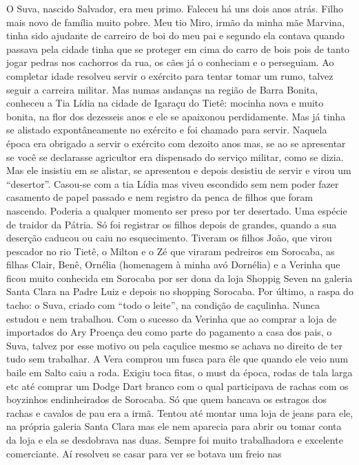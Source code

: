 \documentclass[12pt,brazil,]{book}
\begin{document}
O Suva, nascido Salvador, era meu primo. Faleceu há uns dois anos atrás.
Filho mais novo de família muito pobre. Meu tio Miro, irmão da minha mãe
Marvina, tinha sido ajudante de carreiro de boi do meu pai e segundo ela
contava quando passava pela cidade tinha que se proteger em cima do
carro de bois pois de tanto jogar pedras nos cachorros da rua, os cães
já o conheciam e o perseguiam. Ao completar idade resolveu servir o
exército para tentar tomar um rumo, talvez seguir a carreira militar.
Mas numas andanças na região de Barra Bonita, conheceu a Tia Lídia na
cidade de Igaraçu do Tietê: mocinha nova e muito bonita, na flor dos
dezesseis anos e ele se apaixonou perdidamente. Mas já tinha se alistado
expontâneamente no exército e foi chamado para servir. Naquela época era
obrigado a servir o exército com dezoito anos mas, se ao se apresentar
se você se declarasse agricultor era dispensado do serviço militar, como
se dizia. Mas ele insistiu em se alistar, se apresentou e depois
desistiu de servir e virou um ``desertor''. Casou-se com a tia Lídia mas
viveu escondido sem nem poder fazer casamento de papel passado e nem
registro da penca de filhos que foram nascendo. Poderia a qualquer
momento ser preso por ter desertado. Uma espécie de traidor da Pátria.
Só foi registrar os filhos depois de grandes, quando a sua deserção
caducou ou caiu no esquecimento. Tiveram os filhos João, que virou
pescador no rio Tietê, o Milton e o Zé que viraram pedreiros em
Sorocaba, as filhas Clair, Benê, Ornélia (homenagem à minha avó
Dornélia) e a Verinha que ficou muito conhecida em Sorocaba por ser dona
da loja Shoppig Seven na galeria Santa Clara na Padre Luiz e depois no
shopping Sorocaba. Por último, a raspa do tacho: o Suva, criado com
``todo o leite'', na condição de caçulinha. Nunca estudou e nem
trabalhou. Com o sucesso da Verinha que ao comprar a loja de importados
do Ary Proença deu como parte do pagamento a casa dos pais, o Suva,
talvez por esse motivo ou pela caçulice mesmo se achava no direito de
ter tudo sem trabalhar. A Vera comprou um fusca para êle que quando ele
veio num baile em Salto caiu a roda. Exigiu toca fitas, o must da época,
rodas de tala larga etc até comprar um Dodge Dart branco com o qual
participava de rachas com os boyzinhos endinheirados de Sorocaba. Só que
quem bancava os estragos dos rachas e cavalos de pau era a irmã. Tentou
até montar uma loja de jeans para ele, na própria galeria Santa Clara
mas ele nem aparecia para abrir ou tomar conta da loja e ela se
desdobrava nas duas. Sempre foi muito trabalhadora e excelente
comerciante. Aí resolveu se casar para ver se botava um freio nas
\end{document}
